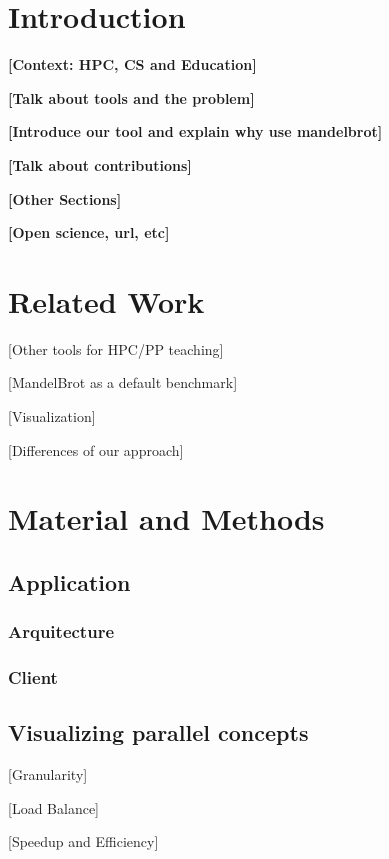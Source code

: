 \documentclass[final,12pt]{elsarticle}
\begin{document}
\section{Introduction}
\label{sec:orgb89c5ab}

\textbf{{[}Context: HPC, CS and Education]}


\textbf{{[}Talk about tools and the problem]}


\textbf{{[}Introduce our tool and explain why use mandelbrot]}


\textbf{{[}Talk about contributions]}


\textbf{{[}Other Sections]}

\textbf{{[}Open science, url, etc]}
\section{Related Work}
\label{sec:orge600160}

{[}Other tools for HPC/PP teaching]

{[}MandelBrot as a default benchmark]

{[}Visualization]

{[}Differences of our approach]
\section{Material and Methods}
\label{sec:org401255e}

\subsection{Application}
\label{sec:orgc458059}

\subsubsection{Arquitecture}
\label{sec:orga15d8ab}

\subsubsection{Client}
\label{sec:orgb8a5364}
\subsection{Visualizing parallel concepts}
\label{sec:org02d7b4c}

{[}Granularity]

{[}Load Balance]

{[}Speedup and Efficiency]
\end{document}
